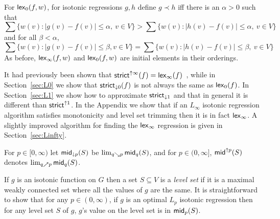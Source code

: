 \documentclass[11pt]{article}
\newcommand{\wmean}[2]{\ensuremath{\mathsf{mid}_{#1}\ifthenelse{\equal{#2}{}}{}{(#2)}}}
\newcommand{\wmeandown}[2]{\ensuremath{\mathsf{mid}_{\downarrow #1}\ifthenelse{\equal{#2}{}}{}{(#2)}}}
\newcommand{\wmeanup}[2]{\ensuremath{\mathsf{mid}^{\uparrow #1}\ifthenelse{\equal{#2}{}}{}{(#2)}}}
\newcommand{\Strictdown}[2]{\ensuremath{\mathsf{strict}_{\downarrow{#1}}\ifthenelse{\equal{#2}{}}{}{(#2)}}}
\newcommand{\Strictup}[2]{\ensuremath{\mathsf{strict}^{\uparrow {#1}}\ifthenelse{\equal{#2}{}}{}{(#2)}}}
\newcommand{\lex}[2]{\ensuremath{\mathsf{lex}_{#1} \ifthenelse{\equal{#2}{}}{}{(#2)}}}
\begin{document}
\noindent
For \lex{0}{f,w}, for isotonic regressions $g, h$ define $g \prec h$ iff there is an $\alpha > 0$ such that 
$$\sum \{w(v): |g(v)\!-\!f(v)| \leq \alpha, ~v \in V\}  > \sum \{w(v): |h(v)\!-\!f(v)| \leq \alpha, ~v \in V\}$$
and for all $\beta < \alpha$,
$$\sum \{w(v): |g(v)\!-\!f(v)| \leq \beta, v \in V\}  = \sum \{w(v): |h(v)\!-\!f(v)| \leq \beta, ~v \in V\}$$
As before, \lex{\infty}{f,w} and \lex{0}{f,w} are initial elements in their orderings.

It had previously been shown that $\Strictup{\infty}{f}=\lex{\infty}{f}$~\cite{QStrictLinfty},
while in Section~\ref{sec:L0} we show that \Strictdown{0}{f} is not always the same as \lex{0}{f}.
In Section~\ref{sec:L1} we show how to approximate \Strictdown{1}{} and that in general it is different than \Strictup{1}{}.
In the Appendix we show that if an $L_\infty$ isotonic regression algorithm satisfies monotonicity and level set trimming then it is in fact \lex{\infty}{}.
A slightly improved algorithm for finding the \lex{\infty}{} regression is given in Section~\ref{sec:Linfty}.

For $p \in [0,\infty)$ let \wmeandown{p}{S} be $\lim_{q \searrow p} \wmean{q}{S}$, and for $p \in (0,\infty]$, \wmeanup{p}{S} denotes $\lim_{q \nearrow p} \wmean{q}{S}$.

If $g$ is an isotonic function on $G$ then a set $S \subseteq V$ is a \textit{level set} if it is a maximal weakly connected set where all the values of $g$ are the same.
It is straightforward to show that for any $p \in (0,\infty)$, if $g$ is an optimal $L_p$ isotonic regression then for any level set $S$ of $g$, $g$'s value on the level set is in \wmean{p}{S}.
\end{document}
